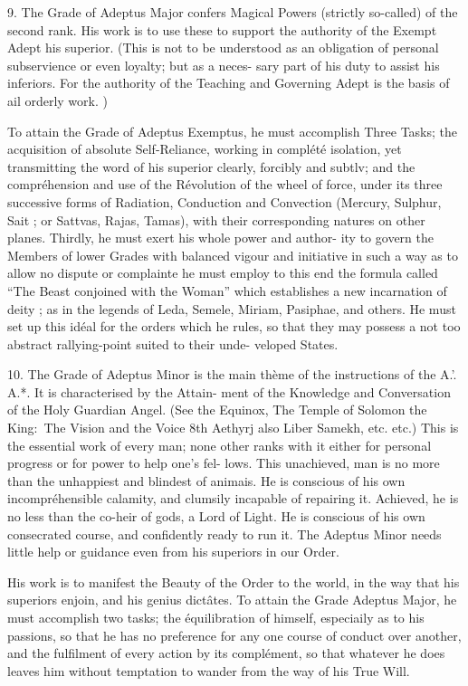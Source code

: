 9. The Grade of Adeptus Major confers Magical Powers (strictly so-called) of the second rank. His work is to use these to support the authority of the Exempt Adept his superior. (This is not to be understood as an obligation of personal subservience or even loyalty; but as a neces- sary part of his duty to assist his inferiors. For the authority of the Teaching and Governing Adept is the basis of ail orderly work. )

To attain the Grade of Adeptus Exemptus, he must accomplish Three Tasks; the acquisition of absolute Self-Reliance, working in complété isolation, yet transmitting the word of his superior clearly, forcibly and subtlv; and the compréhension and use of the Révolution of the wheel of force, under its three successive forms of Radiation, Conduction and Convection (Mercury, Sulphur, Sait ; or Sattvas, Rajas, Tamas), with their corresponding natures on other planes. Thirdly, he must exert his whole power and author- ity to govern the Members of lower Grades with balanced vigour  and initiative in such a way as to allow no dispute or complainte he must employ to this end the formula called “The Beast conjoined with the Woman” which establishes a new incarnation of deity ; as in the legends of Leda, Semele, Miriam, Pasiphae, and others. He must set up this idéal for the orders which he rules, so that they may possess a not too abstract rallying-point suited to their unde- veloped States.

10. The Grade of Adeptus Minor is the main thème of the instructions of the A.'. A.*. It is characterised by the Attain- ment of the Knowledge and Conversation of the Holy Guardian Angel. (See the Equinox, The Temple of Solomon the King:\ The Vision and the Voice 8th Aethyrj also Liber Samekh, etc. etc.) This is the essential work of every man; none other ranks with it either for personal progress or for power to help one’s fel- lows. This unachieved, man is no more than the unhappiest and blindest of animais. He is conscious of his own incompréhensible calamity, and clumsily incapable of repairing it. Achieved, he is no less than the co-heir of gods, a Lord of Light. He is conscious of his own consecrated course, and confidently ready to run it. The Adeptus Minor needs little help or guidance even from his superiors in our Order.

His work is to manifest the Beauty of the Order to the world, in the way that his superiors enjoin, and his genius dictâtes. To attain the Grade Adeptus Major, he must accomplish two tasks; the équilibration of himself, especiaily as to his passions, so that he has no preference for any one course of conduct over another, and the fulfilment of every action by its complément, so that whatever he does leaves him without temptation to wander from the way of his True Will.

